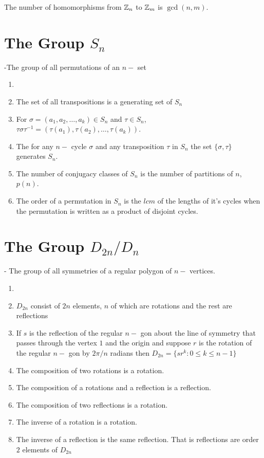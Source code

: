 \begin{theorem}
	The number of homomorphisms from $\mathbb{Z}_n$ to $\mathbb{Z}_m$ is $\gcd(n,m)$.	
\end{theorem}

\section{The Group $S_n$}
-The group of all permutations of an $n-$ set
\begin{theorem}[Properties of $S_n$]
	\begin{enumerate}
		\item[]
		\item 
		The set of all transpositions is a generating set of $S_n$
		\item 
		For $\sigma=(a_1,a_2,\dots,a_k)\in S_n$ and $\tau\in S_n$, $\tau\sigma\tau^{-1}=(\tau(a_1),\tau(a_2),\dots,\tau(a_k))$.
		\item 
		The for any $n-$ cycle $\sigma$ and any transposition $\tau$ in $S_n$ the set $\{\sigma,\tau\}$ generates $S_n$.  
		\item 
		The number of conjugacy classes of $S_n$ is the number of partitions of $n$, $p(n)$. 
		\item 
		The order of a permutation in $S_n$ is the $lcm$ of the lengths of it's cycles when the permutation is written as a product of disjoint cycles. 
	\end{enumerate}
\end{theorem}

\section{The Group $D_{2n}/D_n$}
- The group of all symmetries of a regular polygon of $n-$ vertices.
\begin{theorem}[Properties of $D_n$]
	\begin{enumerate}
		\item[]
		\item 
		$D_{2n}$ consist of $2n$ elements, $n$ of which are rotations and the rest are reflections
		\item 
		If $s$ is the reflection of the regular $n-$ gon about the line of symmetry that passes through the vertex $1$ and the origin and suppose $r$ is the rotation of the regular $n-$ gon by $2\pi/n$ radians then $D_{2n}=\{sr^k:0\leq k\leq n-1\}$
		\item 
		The composition of two rotations is a rotation.
		\item 
		The composition of a rotations and a reflection is a reflection.
		\item 
		The composition of two reflections is a rotation.
		\item 
		The inverse of a rotation is a rotation.
		\item 
		The inverse of a reflection is the same reflection. That is reflections are order $2$ elements of $D_{2n}$
	\end{enumerate}
\end{theorem}


